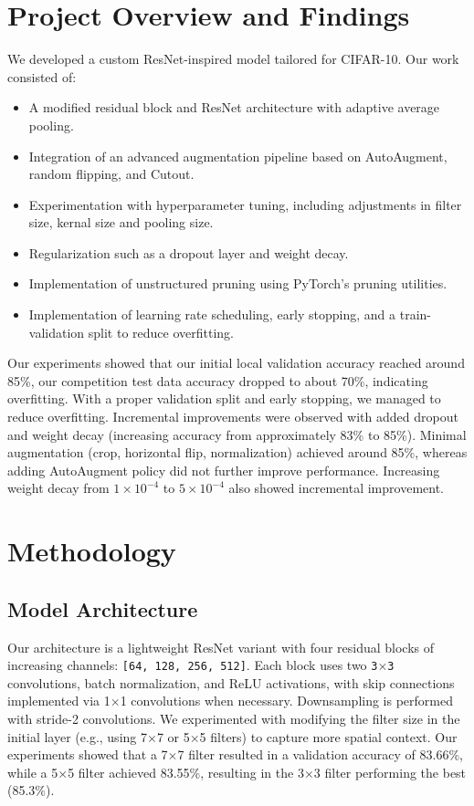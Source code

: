 \documentclass[letterpaper]{article} %
\begin{document}
\section{Project Overview and Findings}
We developed a custom ResNet-inspired model tailored for CIFAR-10. Our work consisted of:
\begin{itemize}
    \item A modified residual block and ResNet architecture with adaptive average pooling.
    \item Integration of an advanced augmentation pipeline based on AutoAugment, random flipping, and Cutout.
    \item Experimentation with hyperparameter tuning, including adjustments in filter size, kernal size and pooling size.
    \item Regularization such as a dropout layer and weight decay.
    \item Implementation of unstructured pruning using PyTorch’s pruning utilities.
    \item Implementation of learning rate scheduling, early stopping, and a train-validation split to reduce overfitting.
\end{itemize}

Our experiments showed that our initial local validation accuracy reached around 85\%, our competition test data accuracy dropped to about 70\%, indicating overfitting. With a proper validation split and early stopping, we managed to reduce overfitting. Incremental improvements were observed with added dropout and weight decay (increasing accuracy from approximately 83\% to 85\%). Minimal augmentation (crop, horizontal flip, normalization) achieved around 85\%, whereas adding AutoAugment policy did not further improve performance. Increasing weight decay from $1\times10^{-4}$ to $5\times10^{-4}$ also showed incremental improvement.

\section{Methodology}
\subsection{Model Architecture}
Our architecture is a lightweight ResNet variant with four residual blocks of increasing channels: \texttt{[64, 128, 256, 512]}. Each block uses two \texttt{3$\times$3} convolutions, batch normalization, and ReLU activations, with skip connections implemented via 1$\times$1 convolutions when necessary. Downsampling is performed with stride-2 convolutions. We experimented with modifying the filter size in the initial layer (e.g., using 7$\times$7 or 5$\times$5 filters) to capture more spatial context. Our experiments showed that a 7$\times$7 filter resulted in a validation accuracy of 83.66\%, while a 5$\times$5 filter achieved 83.55\%, resulting in the 3$\times$3 filter performing the best (85.3\%).
\end{document}
